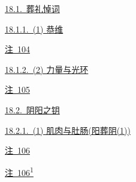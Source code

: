 \par\bigskip{}\par\medskip
\begingroup\small\setlength{\parskip}{0pt}
\par\noindent\hspace*{0.00em}\hyperref[ch18:local:h1]{18.1.~葬礼悼词}\nobreak\dotfill\nobreak\hyperref[ch18:local:h1]{\pageref*{ch18:local:h1}}\par
\par\noindent\hspace*{1.35em}\hyperref[ch18:local:h2]{18.1.1.~(1) 恭维}\nobreak\dotfill\nobreak\hyperref[ch18:local:h2]{\pageref*{ch18:local:h2}}\par
\par\noindent\hspace*{4.05em}\hyperref[ch18:local:n1]{注~104}\nobreak\dotfill\nobreak\hyperref[ch18:local:n1]{\pageref*{ch18:local:n1}}\par
\par\noindent\hspace*{1.35em}\hyperref[ch18:local:h3]{18.1.2.~(2) 力量与光环}\nobreak\dotfill\nobreak\hyperref[ch18:local:h3]{\pageref*{ch18:local:h3}}\par
\par\noindent\hspace*{4.05em}\hyperref[ch18:local:n2]{注~105}\nobreak\dotfill\nobreak\hyperref[ch18:local:n2]{\pageref*{ch18:local:n2}}\par
\par\noindent\hspace*{0.00em}\hyperref[ch18:local:h4]{18.2.~阴阳之钥}\nobreak\dotfill\nobreak\hyperref[ch18:local:h4]{\pageref*{ch18:local:h4}}\par
\par\noindent\hspace*{1.35em}\hyperref[ch18:local:h5]{18.2.1.~(1) 肌肉与肚肠(阳葬阴(1))}\nobreak\dotfill\nobreak\hyperref[ch18:local:h5]{\pageref*{ch18:local:h5}}\par
\par\noindent\hspace*{4.05em}\hyperref[ch18:local:n3]{注~106}\nobreak\dotfill\nobreak\hyperref[ch18:local:n3]{\pageref*{ch18:local:n3}}\par
\par\noindent\hspace*{4.05em}\hyperref[ch18:local:n4]{注~106\textsuperscript{1}}\nobreak\dotfill\nobreak\hyperref[ch18:local:n4]{\pageref*{ch18:local:n4}}\par

